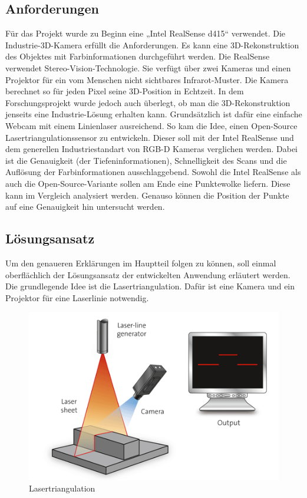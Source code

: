 	\subsection{Anforderungen}
	Für das Projekt wurde zu Beginn eine „Intel RealSense d415“ verwendet. Die Industrie-3D-Kamera erfüllt die Anforderungen. Es kann eine 3D-Rekonstruktion des Objektes mit Farbinformationen durchgeführt werden. Die RealSense verwendet Stereo-Vision-Technologie. Sie verfügt über zwei Kameras und einen Projektor für ein vom Menschen nicht sichtbares Infrarot-Muster. Die Kamera berechnet so für jeden Pixel seine 3D-Position in Echtzeit. In dem Forschungsprojekt wurde jedoch auch überlegt, ob man die 3D-Rekonstruktion jenseits eine Industrie-Lösung erhalten kann. Grundsätzlich ist dafür eine einfache Webcam mit einem Linienlaser ausreichend. So kam die Idee, einen Open-Source Lasertriangulationssensor zu entwickeln.
	Dieser soll mit der Intel RealSense und dem generellen Industriestandart von RGB-D Kameras verglichen werden. Dabei ist die Genauigkeit (der Tiefeninformationen), Schnelligkeit des Scans und die Auflösung der Farbinformationen ausschlaggebend. Sowohl die Intel RealSense als auch die Open-Source-Variante sollen am Ende eine Punktewolke liefern. Diese kann im Vergleich analysiert werden. Genauso können die Position der Punkte auf eine Genauigkeit hin untersucht werden.
	\newpage
	
	\subsection{Lösungsansatz}
	Um den genaueren Erklärungen im Hauptteil folgen zu können, soll einmal oberflächlich der Lösungsansatz der entwickelten Anwendung erläutert werden. Die grundlegende Idee ist die Lasertriangulation. Dafür ist eine Kamera und ein Projektor für eine Laserlinie notwendig.
	\begin{figure}[h]
		\centering
		\includegraphics[width=0.7\linewidth]{img/grundlagen/lasertriangulation_1}
		\caption{Lasertriangulation}
		\label{fig:lasertriangulation}
	\end{figure}

